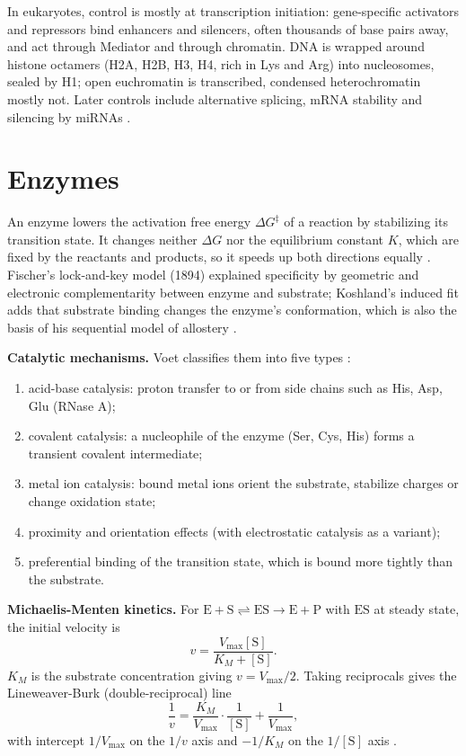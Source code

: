 In eukaryotes, control is mostly at
transcription initiation: gene-specific
activators and repressors bind enhancers and
silencers, often thousands of base pairs
away, and act through Mediator and through
chromatin. DNA is wrapped around histone
octamers (H2A, H2B, H3, H4, rich in Lys and
Arg) into nucleosomes, sealed by H1; open
euchromatin is transcribed, condensed
heterochromatin mostly not. Later controls
include alternative splicing, mRNA stability
and silencing by miRNAs \cite[Chapter
8]{alberts2014essential}.

\section{Enzymes}
\label{section-mcb-enzymes}

An enzyme lowers the activation free energy
$\Delta G^{\ddagger}$ of a reaction by
stabilizing its transition state. It changes
neither $\Delta G$ nor the equilibrium
constant $K$, which are fixed by the
reactants and products, so it speeds up both
directions equally \cite[Section
11-2]{voet2013fundamentals}. Fischer's
lock-and-key model (1894) explained
specificity by geometric and electronic
complementarity between enzyme and substrate;
Koshland's induced fit adds that substrate
binding changes the enzyme's conformation,
which is also the basis of his sequential
model of allostery \cite[Sections 7-1 and
11-1]{voet2013fundamentals}.

\textbf{Catalytic mechanisms.}
Voet classifies them into five types
\cite[Section 11-3]{voet2013fundamentals}:
\begin{enumerate}
\item acid-base catalysis: proton transfer to
or from side chains such as His, Asp, Glu
(RNase A);
\item covalent catalysis: a nucleophile of
the enzyme (Ser, Cys, His) forms a transient
covalent intermediate;
\item metal ion catalysis: bound metal ions
orient the substrate, stabilize charges or
change oxidation state;
\item proximity and orientation effects (with
electrostatic catalysis as a variant);
\item preferential binding of the transition
state, which is bound more tightly than the
substrate.
\end{enumerate}

\textbf{Michaelis-Menten kinetics.}
For $\mathrm{E} + \mathrm{S}
\rightleftharpoons \mathrm{ES} \rightarrow
\mathrm{E} + \mathrm{P}$ with $\mathrm{ES}$
at steady state, the initial velocity is
\begin{equation}
\label{equation-mcb-michaelis-menten}
v = \frac{V_{\max}[\mathrm{S}]}{K_M +
[\mathrm{S}]}.
\end{equation}
$K_M$ is the substrate concentration giving
$v = V_{\max}/2$. Taking reciprocals gives
the Lineweaver-Burk (double-reciprocal) line
\begin{equation}
\label{equation-mcb-lineweaver-burk}
\frac{1}{v} = \frac{K_M}{V_{\max}} \cdot
\frac{1}{[\mathrm{S}]} + \frac{1}{V_{\max}},
\end{equation}
with intercept $1/V_{\max}$ on the $1/v$ axis
and $-1/K_M$ on the $1/[\mathrm{S}]$ axis
\cite[Section 12-1]{voet2013fundamentals}.

